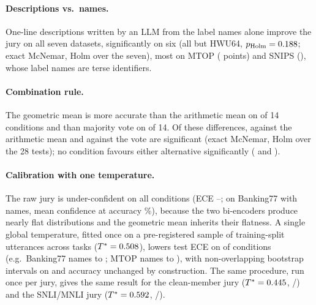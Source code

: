\paragraph{Descriptions vs.\ names.} One-line descriptions written by an LLM from the label names alone improve the
jury on all seven datasets, significantly on six (all but HWU64, $p_\text{Holm}=0.188$; exact
McNemar, Holm over the seven), most on MTOP (\zsMtopDescVsNameGain{} points) and SNIPS
(\zsSnipsDescVsNameGain), whose label names are terse identifiers.

\paragraph{Combination rule.} The geometric mean is more accurate than the arithmetic mean on \zxGeoGtArith{} of 14
conditions and than majority vote on \zxGeoGtVote{} of 14. Of these differences, \zxGeoSigArith{} against the
arithmetic mean and \zxGeoSigVote{} against the vote are significant (exact McNemar, Holm over the 28 tests); no
condition favours either alternative significantly (\zxArithSigGeo{} and \zxVoteSigGeo).

\paragraph{Calibration with one temperature.} The raw jury is under-confident on all \zxRawUnderconfident{}
conditions (ECE \zxRawEceMin--\zxRawEceMax; on Banking77 with names, mean confidence \zxBankingNameRawConf{} at
accuracy \zsBankingNameAcc\%), because the two bi-encoders produce nearly flat distributions and the geometric mean
inherits their flatness. A single global temperature, fitted once on a pre-registered sample of training-split
utterances across tasks ($T^*=0.508$), lowers test ECE on \zxTstarOrigBetter{} of \zxTstarOrigOf{} conditions
(e.g.\ Banking77 names \zxBankingNameRawEce{} to \zxBankingNameTstarEce; MTOP names \zxMtopNameRawEce{} to
\zxMtopNameTstarEce), with non-overlapping bootstrap intervals on \zxTstarCiDisjoint{} and accuracy unchanged by
construction. The same procedure, run once per jury, gives the same result for the clean-member jury
($T^*=0.445$, \zxTstarCleanNliBetter/\zxTstarCleanNliOf) and the SNLI/MNLI jury ($T^*=0.592$,
\zxTstarSnliNliBetter/\zxTstarSnliNliOf).
